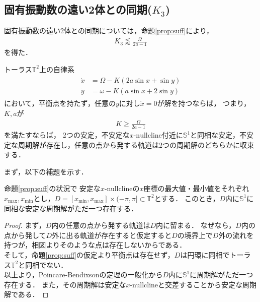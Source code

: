 \documentclass[../main]{subfiles}
\begin{document}
    \subsection{固有振動数の遠い2体との同期($K_3$)}
    固有振動数の遠い2体との同期については，命題\ref{prop:suff}により，
    \begin{align*}
        K_3\lessapprox \frac{\Omega}{2a-1}
    \end{align*}
    を得た．
    \begin{proposition}
        \label{prop:suff}
        トーラス$\mathbb{T}^2$上の自律系
        \begin{align}
            \label{eq:prop-2phase}
            \begin{split}
                \dot{x}&=\Omega-K(2a\sin x+\sin y)\\
                \dot{y}&=\omega-K(a\sin x+2\sin y)
            \end{split}
        \end{align}
        において，平衡点を持たず，任意の$y$に対し$\dot{x}=0$が解を持つならば，
        つまり，$K,a$が
        \begin{align*}
            K\geq \frac{\Omega}{2a-1}
        \end{align*}
        を満たすならば，
        2つの安定，不安定な$x$-$\mathrm{nullcline}$付近に$\mathbb{S}^1$と同相な安定，不安定な周期解が存在し，任意の点から発する軌道は2つの周期解のどちらかに収束する．\\
    \end{proposition}
    まず，以下の補題を示す．
    \begin{lemma}
        \label{lemma:annulus}
        命題\ref{prop:suff}の状況で
        安定な$x$-nullclineの$x$座標の最大値・最小値をそれぞれ$x_{\max},x_{\min}$とし，$D=[x_{\min},x_{\max}]\times (-\pi,\pi ]\subset\mathbb{T}^2$とする．
        このとき，$D$内に$\mathbb{S}^1$に同相な安定な周期解がただ一つ存在する．        
    \end{lemma}
    \begin{proof}
        まず，$D$内の任意の点から発する軌道は$D$内に留まる．
        なぜなら，$D$内の点から発して$D$外に出る軌道が存在すると仮定すると$D$の境界上で$D$外の流れを持つが，相図よりそのような点は存在しないからである．\\
        そして，命題\ref{prop:suff}の仮定より平衡点は存在せず，$D$は円環に同相でトーラス$\mathbb{T}^2$と同相でない．\\
        以上より，Poincare-Bendixsonの定理の一般化から$D$内に$\mathbb{S}^1$に周期解がただ一つ存在する．
        また，その周期解は安定な$x$-nullclineと交差することから安定な周期解である．        
    \end{proof}
\end{document}
